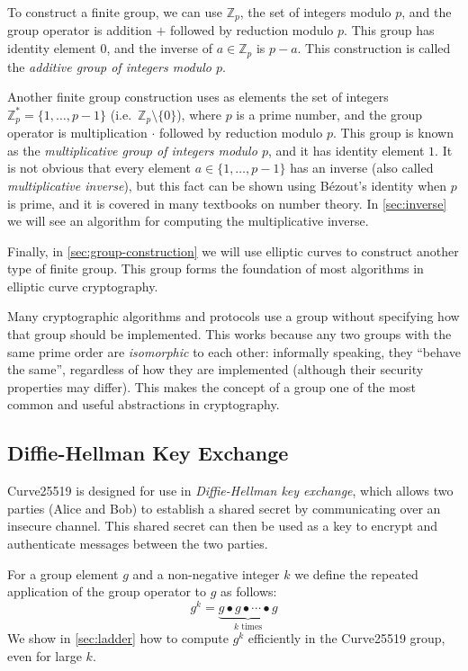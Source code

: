 \documentclass{article}
\begin{document}
To construct a finite group, we can use $\mathbb{Z}_p$, the set of integers modulo $p$, and the group operator is addition $+$ followed by reduction modulo $p$.
This group has identity element $0$, and the inverse of $a \in \mathbb{Z}_p$ is $p-a$.
This construction is called the \emph{additive group of integers modulo $p$}.

Another finite group construction uses as elements the set of integers $\mathbb{Z}_p^* = \{1,\dots, p-1\}$ (i.e.\ $\mathbb{Z}_p \setminus \{0\}$), where $p$ is a prime number, and the group operator is multiplication $\cdot$ followed by reduction modulo $p$.
This group is known as the \emph{multiplicative group of integers modulo $p$}, and it has identity element $1$.
It is not obvious that every element $a \in \{1,\dots, p-1\}$ has an inverse (also called \emph{multiplicative inverse}), but this fact can be shown using Bézout's identity when $p$ is prime, and it is covered in many textbooks on number theory.
In \autoref{sec:inverse} we will see an algorithm for computing the multiplicative inverse.

Finally, in \autoref{sec:group-construction} we will use elliptic curves to construct another type of finite group.
This group forms the foundation of most algorithms in elliptic curve cryptography.

Many cryptographic algorithms and protocols use a group without specifying how that group should be implemented.
This works because any two groups with the same prime order are \emph{isomorphic} to each other: informally speaking, they ``behave the same'', regardless of how they are implemented (although their security properties may differ).
This makes the concept of a group one of the most common and useful abstractions in cryptography.

\subsection{Diffie-Hellman Key Exchange}\label{sec:diffie-hellman}

Curve25519 is designed for use in \emph{Diffie-Hellman key exchange}, which allows two parties (Alice and Bob) to establish a shared secret by communicating over an insecure channel.
This shared secret can then be used as a key to encrypt and authenticate messages between the two parties.

For a group element $g$ and a non-negative integer $k$ we define the repeated application of the group operator to $g$ as follows:
\begin{equation}\label{eq:power}
g^k = \underbrace{g \bullet g \bullet \cdots \bullet g}_\text{$k$ times}
\end{equation}
We show in \autoref{sec:ladder} how to compute $g^k$ efficiently in the Curve25519 group, even for large $k$.
\end{document}
